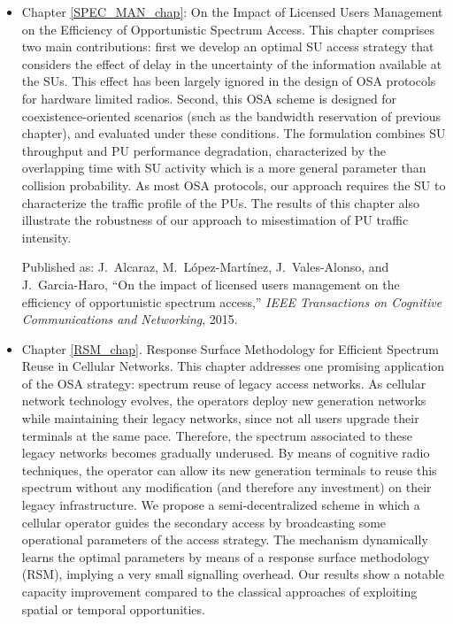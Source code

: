 \begin{itemize}
\item Chapter \ref{SPEC_MAN_chap}: On the Impact of Licensed Users Management on the Efficiency of Opportunistic Spectrum Access.
This chapter comprises two main contributions: first we develop an optimal SU access strategy that considers the effect of delay in the uncertainty of the information available at the SUs. This effect has been largely ignored in the design of OSA protocols for hardware limited radios. Second, this OSA scheme is designed for coexistence-oriented scenarios (such as the bandwidth reservation of previous chapter), and evaluated under these conditions.
The formulation combines SU throughput and PU performance degradation, characterized by the overlapping time with SU activity which is a more general parameter than collision probability.    
As most OSA protocols, our approach requires the SU to characterize the traffic profile of the PUs. The results of this chapter also illustrate the robustness of our approach to misestimation of PU traffic intensity.

Published as: J.~Alcaraz, M.~L\'{o}pez-Mart\'{i}nez, J.~Vales-Alonso, and J.~Garcia-Haro, ``On the impact of licensed users management on the efficiency of
  opportunistic spectrum access,'' \emph{{IEEE} Transactions on Cognitive
  Communications and Networking}, 2015.

\item Chapter \ref{RSM_chap}. Response Surface Methodology for Efficient Spectrum Reuse in Cellular Networks.
This chapter addresses one promising application of the OSA strategy: spectrum reuse of legacy access networks. As cellular network technology evolves, the operators deploy new generation networks while maintaining their legacy networks, since not all users upgrade their terminals at the same pace.
Therefore, the spectrum associated to these legacy networks becomes gradually underused.
By means of cognitive radio techniques, the operator can allow its new generation terminals to reuse this spectrum without any modification (and therefore any investment) on their legacy infrastructure.
We propose a semi-decentralized scheme in which a cellular operator guides the secondary access by broadcasting some operational parameters of the access strategy.
The mechanism dynamically learns the optimal parameters by means of a response surface methodology (RSM), implying a very small signalling overhead.
Our results show a notable capacity improvement compared to the classical approaches of exploiting spatial or temporal opportunities.


\end{itemize}
